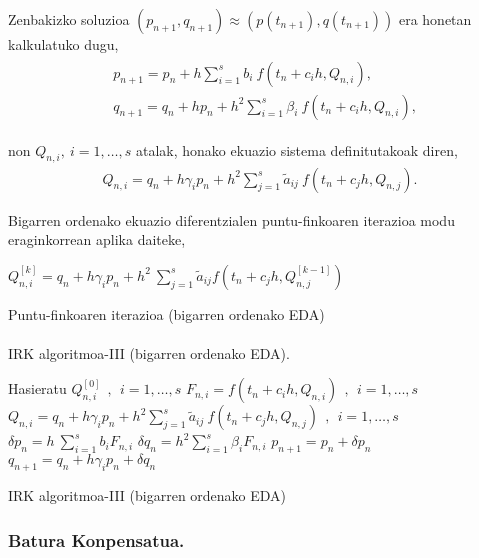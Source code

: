 Zenbakizko soluzioa $(p_{n+1},q_{n+1}) \approx (p(t_{n+1}),q(t_{n+1}))$ era honetan kalkulatuko dugu,
\begin{align}
\begin{split}
&p_{n+1}=p_n+ h \sum\limits_{i=1}^{s} b_i \ f(t_n+c_ih,Q_{n,i}),\\
&q_{n+1}=q_n+ h p_{n} + h^2 \sum\limits_{i=1}^{s} \beta_i \ f(t_n+c_ih,Q_{n,i}),
\end{split}
\end{align}

non $Q_{n,i}, \ i=1,\dots,s$ atalak, honako ekuazio sistema definitutakoak diren, 
\begin{align}
Q_{n,i}=q_n+ h\gamma_i p_n+ h^2 \sum\limits_{j=1}^{s} \tilde{a}_{ij} \ f(t_n+c_jh,Q_{n,j}).
\end{align}

Bigarren ordenako ekuazio diferentzialen puntu-finkoaren iterazioa modu eraginkorrean aplika daiteke,

\begin{algorithm}[H]
  {
   $Q_{n,i}^{[k]}=q_{n}+h \gamma_i p_{n}+ h^2 \ \sum\limits_{j=1}^{s} \tilde{a}_{ij} f(t_n+c_jh,Q_{n,j}^{[k-1]}) $\;  
  }
 \caption{Puntu-finkoaren iterazioa (bigarren ordenako EDA)}
\end{algorithm} 

\paragraph*{}IRK algoritmoa-III (bigarren ordenako EDA).

\begin{algorithm}[H]
 \BlankLine
  {
   \BlankLine
   Hasieratu  $Q_{n,i}^{[0]} \ \ , \ \ i=1,\dots,s $\;
    \BlankLine
   {
    \BlankLine 
    $F_{n,i}=f(t_n+c_ih,Q_{n,i}) \ \ , \ \  i=1,\dots,s$\;
    $Q_{n,i}=q_n+ h\gamma_i p_n+ h^2 \sum\limits_{j=1}^{s} \tilde{a}_{ij} \ f(t_n+c_jh,Q_{n,j}) \ \ , \ \  i=1,\dots,s$\;  
   }
   \BlankLine
    $\delta p_n=h \ \sum\limits_{i=1}^{s} b_i F_{n,i}$\;
    $\delta q_n=h^2 \sum\limits_{i=1}^{s} \beta_i F_{n,i}$\;    
    $p_{n+1}=p_{n}+ \delta p_n $\;
    $q_{n+1}=q_{n}+ h\gamma_i p_n+\delta q_n $\;
   \BlankLine
 }
 \caption{IRK algoritmoa-III (bigarren ordenako EDA)}\label{alg:IRK2}
\end{algorithm}


\subsubsection*{Batura Konpensatua.}

